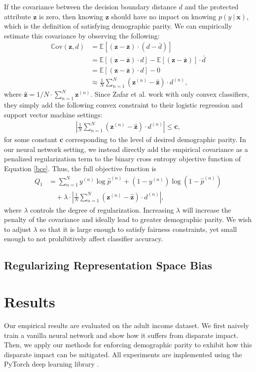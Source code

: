 \documentclass{article}
\newcommand{\E}{\mathbb{E}}
\newcommand{\Cov}{\mathbb{C}\text{ov}}
\newcommand\given[1][]{\:#1\vert\:}
\newcommand{\bd}[1]{\boldsymbol{#1}}
\newcommand{\hp}{\hat{p}}
\newcommand{\zbar}{\bar{z}}
\newcommand{\hz}{\hat{z}}
\newcommand{\dbar}{\bar{d}}
\newcommand{\idx}[3][]{{#2}^{(#3)}_{#1}}
\newcommand{\bidx}[3][]{\bd{#2}^{(#3)}_{#1}}
\begin{document}
If the covariance between the decision boundary distance $d$ and the protected attribute $\bd z$ is zero, then knowing $\bd z$ should have no impact on knowing $p(y \given \bd x)$, which is the definition of satisfying demographic parity.  We can empirically estimate this covariance by observing the following:
\begin{align}
\Cov(\bd z, d) &= \E[(\bd z - \bd \zbar) \cdot (d - \dbar)] \\
&= \E[(\bd z - \bd \zbar) \cdot d] - \E[(\bd z - \bd \zbar)] \cdot \dbar \nonumber \\
&= \E[(\bd z - \bd \zbar) \cdot d] - 0 \nonumber \\
&\approx \frac{1}{N} \sum_{n=1}^N (\bidx z n - \bd \hz) \cdot \idx d n, \nonumber
\end{align}      
where $\bd \hz = 1 / N \cdot \sum_{n=1}^N \bidx z n$.  Since Zafar et al.  work with only convex classifiers, they simply add the following convex constraint to their logistic regression and support vector machine settings:
\begin{align}
\left | \frac{1}{N} \sum_{n=1}^N (\bidx z n - \bd \hz) \cdot \idx d n \right | \leq \bd c,
\end{align}
for some constant $\bd c$ corresponding to the level of desired demographic parity.  In our neural network setting, we instead directly add the empirical covariance as a penalized regularization term to the binary cross entropy objective function of Equation \ref{bce}.  Thus, the full objective function is
\begin{align}
Q_1 &= \sum_{n=1}^N \idx y n \log \idx \hp n + (1 - \idx y n) \log (1 - \idx \hp n) \label{penalty-bce} \\ 
&\quad + \lambda \cdot \left | \frac{1}{N}  \sum_{n=1}^N (\bidx z n - \bd \hz) \cdot \idx d n \right|, \nonumber
\end{align}
where $\lambda$ controls the degree of regularization.  Increasing $\lambda$ will increase the penalty of the covariance and ideally lead to greater demographic parity.  We wish to adjust $\lambda$ so that it is large enough to satisfy fairness constraints, yet small enough to not prohibitively affect classifier accuracy.    

\subsection{Regularizing Representation Space Bias}

\section{Results}
Our empirical results are evaluated on the adult income dataset.  We first naively train a vanilla neural network and show how it suffers from disparate impact.  Then, we apply our methods for enforcing demographic parity to exhibit how this disparate impact can be mitigated.  All experiments are implemented using the PyTorch deep learning library \citep{paszke2017pytorch}.  
\end{document}
